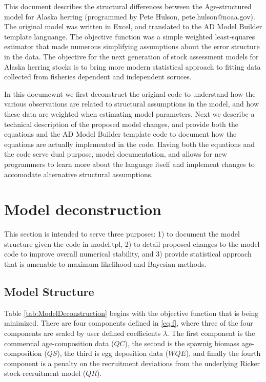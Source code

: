 \documentclass[12pt,letterpaper]{article}
\begin{document}
  This document describes the structural differences between the Age-structured model for Alaska herring (programmed by Pete Hulson, pete.hulson@noaa.gov). The original model was written in Excel, and translated to the AD Model Builder template languange.  The objective function was a simple weighted least-squares estimator that made numerous simplifying assumptions about the error structure in the data.  The objective for the next generation of stock assessment models for Alaska herring stocks is to bring more modern statistical approach to fitting data collected from fisheries dependent and independent soruces.  

  In this documewnt we first deconstruct the original code to understand how the various observations are related to structural assumptions in the model, and how these data are weighted when estimating model parameters.  Next we describe a technical description of the proposed model changes, and provide both the equations and the AD Model Builder template code to document how the equations are actually implemented in the code.  Having both the equations and the code serve dual purpose, model documentation, and allows for new programmers to learn more about the language itself and implement changes to accomodate alternative structural assumptions.
  

  \section{Model deconstruction} %
  \label{sec:model_deconstruction}
  This section is intended to serve three purposes: 1) to document the model structure given the code in model.tpl,  2) to detail proposed changes to the model code to improve overall numerical stability, and 3) provide statistical approach that is amenable to maximum likelihood and Bayesian methods.

    \subsection{Model Structure} %
    \label{sub:model_structure}
    
    Table \ref{tab:ModelDeconstruction} begins with the objective function that is being minimized.   There are four components defined in \eqref{eq.f}, where three of the four components are scaled by user defined coefficients $\lambda$.  The first component is the commercial age-composition data ($QC$), the second is the spawnig biomass age-composition ($QS$), the third is egg deposition data ($WQE$), and finally the fourth component is a penalty on the recruitment deviations from the underlying Ricker stock-recruitment model ($QR$).
\end{document}
